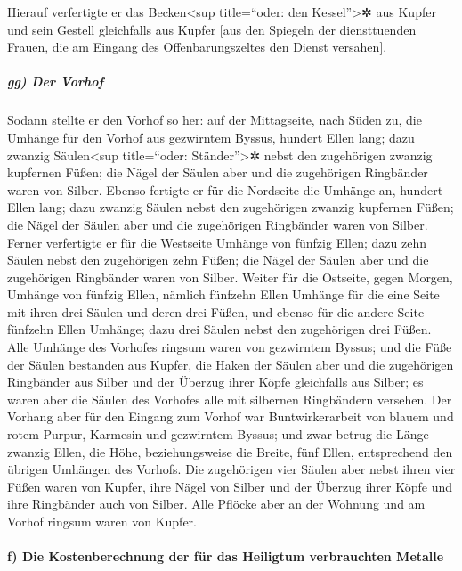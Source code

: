  Hierauf verfertigte er das Becken\textless sup
title=``oder: den Kessel''\textgreater✲ aus Kupfer und sein Gestell
gleichfalls aus Kupfer {[}aus den Spiegeln der diensttuenden Frauen, die
am Eingang des Offenbarungszeltes den Dienst versahen{]}.

\hypertarget{gg-der-vorhof}{%
\subparagraph{gg) Der Vorhof}\label{gg-der-vorhof}}

 Sodann stellte er den Vorhof so her: auf der Mittagseite,
nach Süden zu, die Umhänge für den Vorhof aus gezwirntem Byssus, hundert
Ellen lang;  dazu zwanzig Säulen\textless sup
title=``oder: Ständer''\textgreater✲ nebst den zugehörigen zwanzig
kupfernen Füßen; die Nägel der Säulen aber und die zugehörigen
Ringbänder waren von Silber.  Ebenso fertigte er für die
Nordseite die Umhänge an, hundert Ellen lang; dazu zwanzig Säulen nebst
den zugehörigen zwanzig kupfernen Füßen; die Nägel der Säulen aber und
die zugehörigen Ringbänder waren von Silber.  Ferner
verfertigte er für die Westseite Umhänge von fünfzig Ellen; dazu zehn
Säulen nebst den zugehörigen zehn Füßen; die Nägel der Säulen aber und
die zugehörigen Ringbänder waren von Silber.  Weiter für
die Ostseite, gegen Morgen, Umhänge von fünfzig Ellen, 
nämlich fünfzehn Ellen Umhänge für die eine Seite mit ihren drei Säulen
und deren drei Füßen,  und ebenso für die andere Seite
fünfzehn Ellen Umhänge; dazu drei Säulen nebst den zugehörigen drei
Füßen.  Alle Umhänge des Vorhofes ringsum waren von
gezwirntem Byssus;  und die Füße der Säulen bestanden aus
Kupfer, die Haken der Säulen aber und die zugehörigen Ringbänder aus
Silber und der Überzug ihrer Köpfe gleichfalls aus Silber; es waren aber
die Säulen des Vorhofes alle mit silbernen Ringbändern versehen.
 Der Vorhang aber für den Eingang zum Vorhof war
Buntwirkerarbeit von blauem und rotem Purpur, Karmesin und gezwirntem
Byssus; und zwar betrug die Länge zwanzig Ellen, die Höhe,
beziehungsweise die Breite, fünf Ellen, entsprechend den übrigen
Umhängen des Vorhofs.  Die zugehörigen vier Säulen aber
nebst ihren vier Füßen waren von Kupfer, ihre Nägel von Silber und der
Überzug ihrer Köpfe und ihre Ringbänder auch von Silber. 
Alle Pflöcke aber an der Wohnung und am Vorhof ringsum waren von Kupfer.

\hypertarget{f-die-kostenberechnung-der-fuxfcr-das-heiligtum-verbrauchten-metalle}{%
\paragraph{f) Die Kostenberechnung der für das Heiligtum verbrauchten
Metalle}\label{f-die-kostenberechnung-der-fuxfcr-das-heiligtum-verbrauchten-metalle}}

